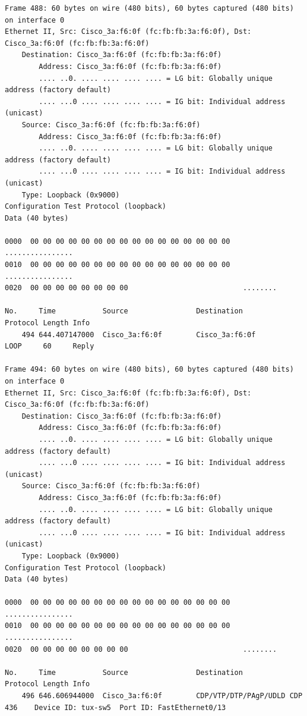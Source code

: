 \documentclass[a4paper,11pt]{article}
\begin{document}
\begin{lstlisting}
Frame 488: 60 bytes on wire (480 bits), 60 bytes captured (480 bits) on interface 0
Ethernet II, Src: Cisco_3a:f6:0f (fc:fb:fb:3a:f6:0f), Dst: Cisco_3a:f6:0f (fc:fb:fb:3a:f6:0f)
    Destination: Cisco_3a:f6:0f (fc:fb:fb:3a:f6:0f)
        Address: Cisco_3a:f6:0f (fc:fb:fb:3a:f6:0f)
        .... ..0. .... .... .... .... = LG bit: Globally unique address (factory default)
        .... ...0 .... .... .... .... = IG bit: Individual address (unicast)
    Source: Cisco_3a:f6:0f (fc:fb:fb:3a:f6:0f)
        Address: Cisco_3a:f6:0f (fc:fb:fb:3a:f6:0f)
        .... ..0. .... .... .... .... = LG bit: Globally unique address (factory default)
        .... ...0 .... .... .... .... = IG bit: Individual address (unicast)
    Type: Loopback (0x9000)
Configuration Test Protocol (loopback)
Data (40 bytes)

0000  00 00 00 00 00 00 00 00 00 00 00 00 00 00 00 00   ................
0010  00 00 00 00 00 00 00 00 00 00 00 00 00 00 00 00   ................
0020  00 00 00 00 00 00 00 00                           ........

No.     Time           Source                Destination           Protocol Length Info
    494 644.407147000  Cisco_3a:f6:0f        Cisco_3a:f6:0f        LOOP     60     Reply

Frame 494: 60 bytes on wire (480 bits), 60 bytes captured (480 bits) on interface 0
Ethernet II, Src: Cisco_3a:f6:0f (fc:fb:fb:3a:f6:0f), Dst: Cisco_3a:f6:0f (fc:fb:fb:3a:f6:0f)
    Destination: Cisco_3a:f6:0f (fc:fb:fb:3a:f6:0f)
        Address: Cisco_3a:f6:0f (fc:fb:fb:3a:f6:0f)
        .... ..0. .... .... .... .... = LG bit: Globally unique address (factory default)
        .... ...0 .... .... .... .... = IG bit: Individual address (unicast)
    Source: Cisco_3a:f6:0f (fc:fb:fb:3a:f6:0f)
        Address: Cisco_3a:f6:0f (fc:fb:fb:3a:f6:0f)
        .... ..0. .... .... .... .... = LG bit: Globally unique address (factory default)
        .... ...0 .... .... .... .... = IG bit: Individual address (unicast)
    Type: Loopback (0x9000)
Configuration Test Protocol (loopback)
Data (40 bytes)

0000  00 00 00 00 00 00 00 00 00 00 00 00 00 00 00 00   ................
0010  00 00 00 00 00 00 00 00 00 00 00 00 00 00 00 00   ................
0020  00 00 00 00 00 00 00 00                           ........

No.     Time           Source                Destination           Protocol Length Info
    496 646.606944000  Cisco_3a:f6:0f        CDP/VTP/DTP/PAgP/UDLD CDP      436    Device ID: tux-sw5  Port ID: FastEthernet0/13  


\end{lstlisting}
\end{document}
